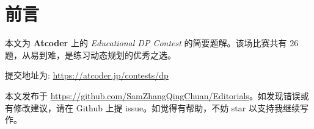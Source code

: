 \maketitle
\tableofcontents
\newpage
\section*{前言}

本文为 \textbf{Atcoder} 上的 \emph{Educational DP Contest} 的简要题解。该场比赛共有 26 题，从易到难，是练习动态规划的优秀之选。

提交地址为: \url{ https://atcoder.jp/contests/dp}

本文发布于 \url{https://github.com/SamZhangQingChuan/Editorials}。如发现错误或有修改建议，请在 Github 上提 issue。如觉得有帮助，不妨 star 以支持我继续写作。

\newpage
